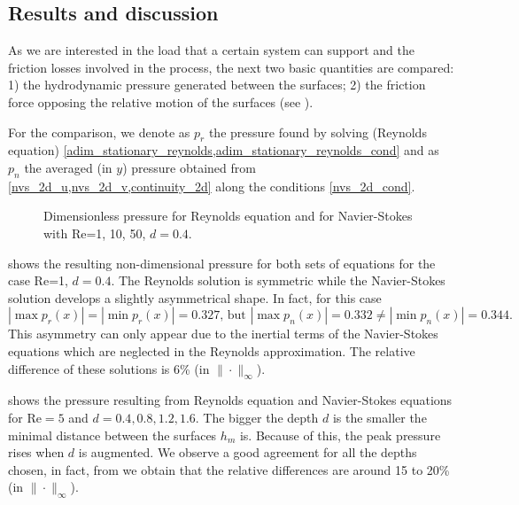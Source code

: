 \subsection*{Results and discussion}
As we are interested in the load that a certain system can support and the friction losses involved in the process, the next two basic quantities are compared: 1) the hydrodynamic pressure generated between the surfaces; 2) the friction force opposing the relative motion of the surfaces (see ).

For the comparison, we denote as $p_r$ the pressure found by solving (Reynolds equation) \eqref{adim_stationary_reynolds,adim_stationary_reynolds_cond} and as $p_n$ the averaged (in $y$) pressure obtained from \eqref{nvs_2d_u,nvs_2d_v,continuity_2d} along the conditions \eqref*{nvs_2d_cond}. 
\begin{figure}[ht]
 \centering 
 \def\svgwidth{0.9\textwidth}\small{
}
\caption[Dimensionless pressure from Navier-Stokes equations and from Reynolds equation for different Reynolds number.]{Dimensionless pressure for Reynolds equation and for Navier-Stokes with Re=1, 10, 50, $d=0.4$.}\label{fig:pres_nvs_rey_ex1}	
\end{figure}

 shows the resulting non-dimensional pressure for both sets of equations for the case Re=1, $d=0.4$. The Reynolds solution is symmetric while the Navier-Stokes solution develops a slightly asymmetrical shape. In fact, for this case $$|\max{p_r(x)}|=|\min{p_r(x)}|=0.327,\,\text{but }|\max{p_n(x)}|=0.332\neq|\min{p_n(x)}|=0.344.$$
This asymmetry can only appear due to the inertial terms of the Navier-Stokes equations which are neglected in the Reynolds approximation. The relative difference of these solutions is 6\% (in $\|\cdot\|_\infty$).

 shows the pressure resulting from Reynolds equation and Navier-Stokes equations for Re${}=5$ and $d=0.4,0.8,1.2,1.6$. The bigger the depth $d$ is the smaller the minimal distance between the surfaces $h_m$ is. Because of this, the peak pressure rises when $d$ is augmented. We observe a good agreement for all the depths chosen, in fact, from   we obtain that the relative differences are around 15 to 20\% (in $\|\cdot\|_\infty$).


